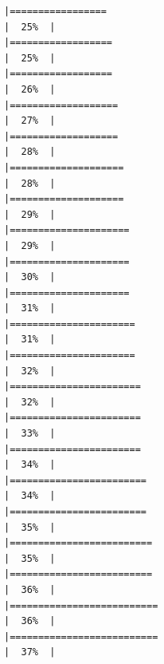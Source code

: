 \documentclass[
]{article}
\begin{document}
\begin{verbatim}
|=================                                                     |  25%  |                                                                              |==================                                                    |  25%  |                                                                              |==================                                                    |  26%  |                                                                              |===================                                                   |  27%  |                                                                              |===================                                                   |  28%  |                                                                              |====================                                                  |  28%  |                                                                              |====================                                                  |  29%  |                                                                              |=====================                                                 |  29%  |                                                                              |=====================                                                 |  30%  |                                                                              |=====================                                                 |  31%  |                                                                              |======================                                                |  31%  |                                                                              |======================                                                |  32%  |                                                                              |=======================                                               |  32%  |                                                                              |=======================                                               |  33%  |                                                                              |=======================                                               |  34%  |                                                                              |========================                                              |  34%  |                                                                              |========================                                              |  35%  |                                                                              |=========================                                             |  35%  |                                                                              |=========================                                             |  36%  |                                                                              |==========================                                            |  36%  |                                                                              |==========================                                            |  37%  |                                                                              
\end{verbatim}
\end{document}
